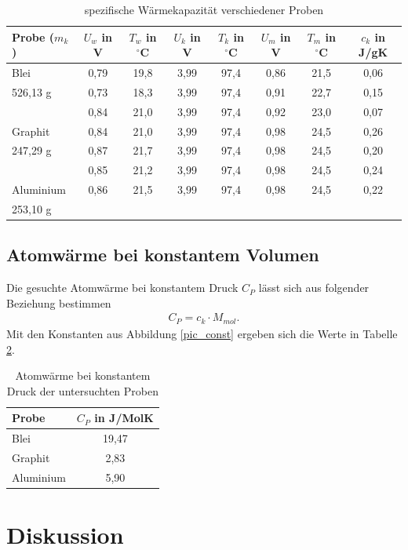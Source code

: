 \begin{table}[H]
 \begin{tabular}{l|c|c|c|c|c|c|c}
 Probe ($m_k$)& $U_w$ in V & $T_w$ in $^\circ$C & $U_k$ in V & $T_k$ in $^\circ$C & $U_m$ in V & $T_m$ in $^\circ$C & $c_k$ in J/gK\\
 \hline
Blei&	0,79&	19,8&	3,99&	97,4&	0,86&	21,5 & 0,06\\
526,13 g&	0,73&	18,3&	3,99&	97,4&	0,91&	22,7 & 0,15\\
	&0,84&	21,0&	3,99&	97,4&	0,92&	23,0 & 0,07\\
	\hline
Graphit	&0,84&	21,0&	3,99&	97,4&	0,98&	24,5 & 0,26\\
247,29	g&0,87&	21,7&	3,99&	97,4&	0,98&	24,5 & 0,20\\
	&0,85&	21,2&	3,99&	97,4&	0,98&	24,5 & 0,24\\
	\hline
Aluminium&	0,86&	21,5&	3,99&	97,4&	0,98&	24,5 & 0,22\\
253,10 g	& & & & & &				

 \end{tabular}
\caption{spezifische Wärmekapazität verschiedener Proben}
\label{tab_ck}
\end{table}

\subsection{Atomwärme bei konstantem Volumen}
Die gesuchte Atomwärme bei konstantem Druck $C_P$ lässt sich aus folgender Beziehung bestimmen
\begin{align}
 C_P = c_k \cdot M_{mol}.
\end{align}
Mit den Konstanten aus Abbildung \ref{pic_const} ergeben sich die Werte in Tabelle \ref{tab_cp}.
\begin{table}[H]
 \begin{tabular}{l|c}
 Probe & $C_P$ in J/MolK\\
 \hline
Blei &19,47\\
Graphit &2,83\\
Aluminium &5,90
 \end{tabular}
\caption{Atomwärme bei konstantem Druck der untersuchten Proben}
\label{tab_cp}
\end{table}


\section{Diskussion}





